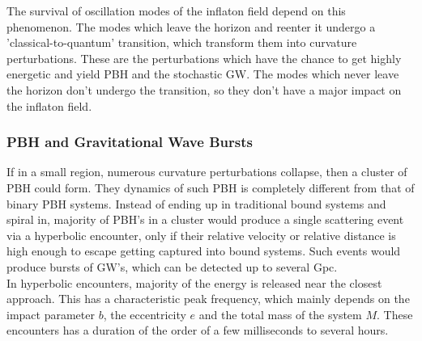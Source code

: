 The survival of oscillation modes of the inflaton field depend on this phenomenon. The modes which leave the horizon and reenter it undergo a 'classical-to-quantum' transition, which transform them into curvature perturbations. These are the perturbations which have the chance to get highly energetic and yield PBH and the stochastic GW. The modes which never leave the horizon don't undergo the transition, so they don't have a major impact on the inflaton field. \cite{CHE}

\subsubsection{PBH and Gravitational Wave Bursts}
If in a small region, numerous curvature perturbations collapse, then a cluster of PBH could form. They dynamics of such PBH is completely different from that of binary PBH systems. Instead of ending up in traditional bound systems and spiral in, majority of PBH's in a cluster would produce a single scattering event via a hyperbolic encounter, only if their relative velocity or relative distance is high enough to escape getting captured into bound systems. Such events would produce bursts of GW's, which can be detected up to several Gpc. \\

In hyperbolic encounters, majority of the energy is released near the closest approach. This has a characteristic peak frequency, which mainly depends on the impact parameter $b$, the eccentricity $e$ and the total mass of the system $M$. These encounters has a duration of the order of a few milliseconds to several hours.\\

